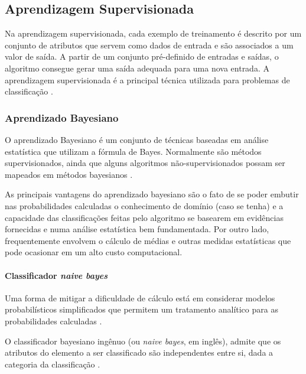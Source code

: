 \subsection{Aprendizagem Supervisionada}

Na aprendizagem supervisionada, cada exemplo de treinamento é descrito por um conjunto de atributos que servem como dados de entrada e são associados a um valor de saída. A partir de um conjunto pré-definido de entradas e saídas, o algoritmo consegue gerar uma saída adequada para uma nova entrada. A aprendizagem supervisionada é a principal técnica utilizada para problemas de classificação \cite{mohri2012}.

\subsubsection{Aprendizado Bayesiano}

O aprendizado Bayesiano é um conjunto de técnicas baseadas em análise estatística que utilizam a fórmula de Bayes. Normalmente são métodos supervisionados, ainda que alguns algoritmos não-supervisionados possam ser mapeados em métodos bayesianos \cite{mitchell1997}.

As principais vantagens do aprendizado bayesiano são o fato de se poder embutir nas probabilidades calculadas o conhecimento de domínio (caso se tenha) e a capacidade das classificações feitas pelo algoritmo se basearem em evidências fornecidas e numa análise estatística bem fundamentada. Por outro lado, frequentemente envolvem o cálculo de médias e outras medidas estatísticas que pode ocasionar em um alto custo computacional.

\paragraph{Classificador \textit{naive bayes}}

Uma forma de mitigar a dificuldade de cálculo está em considerar modelos probabilísticos simplificados que permitem um tratamento analítico para as probabilidades calculadas \cite{pardo2002}.

O classificador bayesiano ingênuo (ou \textit{naive bayes}, em inglês), admite que os atributos do elemento a ser classificado são independentes entre si, dada a categoria da classificação \cite{pellucci2011}.

